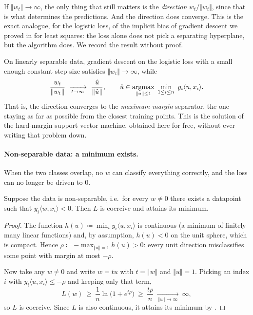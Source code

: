 \begin{remark}
If $\Vert w_t \Vert \to \infty$, the only thing that still matters is the
\emph{direction} $w_t / \Vert w_t \Vert$, since that is what determines the
predictions. And the direction does converge. This is the exact analogue, for the
logistic loss, of the implicit bias of gradient descent we proved in
 for least squares: the loss alone does not pick a separating
hyperplane, but the algorithm does. We record the result without proof.
\end{remark}

\begin{fact}
On linearly separable data, gradient descent on the logistic loss with a small enough
constant step size satisfies $\Vert w_t \Vert \to \infty$,
while
\[
\frac{w_t}{\Vert w_t \Vert} \ \xrightarrow[t \to \infty]{} \ \frac{\hat u}{\Vert \hat u \Vert} ,
\qquad
\hat u \in \argmax_{\Vert u \Vert \leq 1} \ \min_{1 \leq i \leq n} \ y_i \langle u, x_i \rangle .
\]
That is, the direction converges to the \emph{maximum-margin} separator, the one
staying as far as possible from the closest training points. This is the solution of
the hard-margin support vector machine, obtained here for free, without ever writing
that problem down.
\end{fact}

\paragraph{Non-separable data: a minimum exists.}
When the two classes overlap, no $w$ can classify everything correctly, and the loss
can no longer be driven to $0$.

\begin{prop}
\label{prop:nonsep-min}
Suppose the data is non-separable, i.e.\ for every $w \neq 0$ there exists a datapoint
such that $y_i \langle w, x_i \rangle < 0$. Then $L$ is coercive and attains its
minimum.
\end{prop}

\begin{proof}
The function $h(u) \coloneqq \min_i y_i \langle u, x_i \rangle$ is continuous (a
minimum of finitely many linear functions) and, by assumption, $h(u) < 0$ on the unit
sphere, which is compact. Hence $\rho \coloneqq - \max_{\Vert u \Vert = 1} h(u) > 0$:
every unit direction misclassifies some point with margin at most $-\rho$.

Now take any $w \neq 0$ and write $w = t u$ with $t = \Vert w \Vert$ and $\Vert u
\Vert = 1$. Picking an index $i$ with $y_i \langle u, x_i \rangle \leq -\rho$ and
keeping only that term,
\[
L(w) \ \geq \ \frac1n \ln\big( 1 + e^{t \rho} \big) \ \geq \ \frac{t \rho}{n}
\ \xrightarrow[\ \Vert w \Vert \to \infty\ ]{} \ \infty ,
\]
so $L$ is coercive. Since $L$ is also continuous, it attains its minimum by .
\end{proof}


